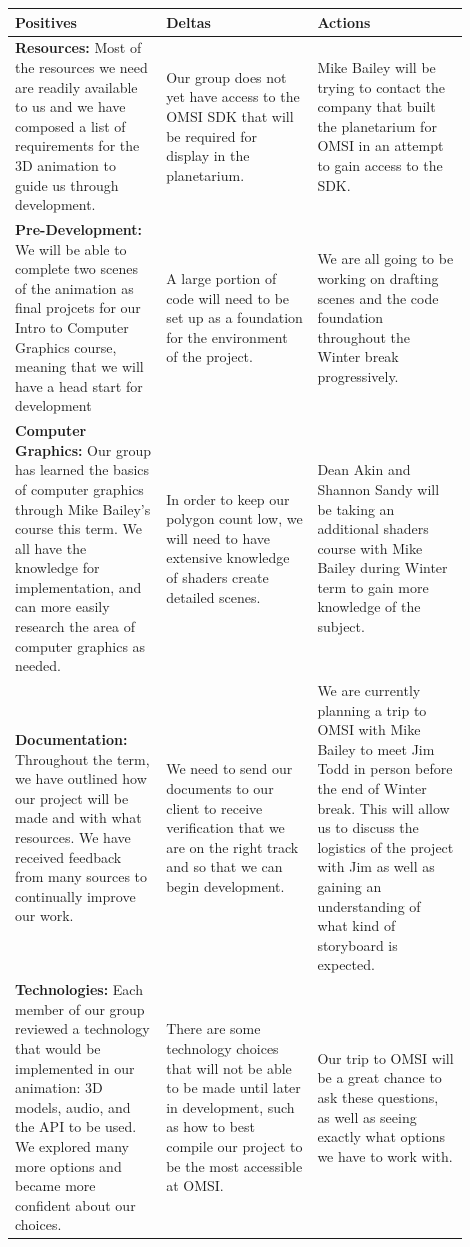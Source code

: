 \documentclass[onecolumn, draftclsnofoot,10pt, compsoc]{IEEEtran}
\begin{document}
\begin{tabular}{|p{0.3\linewidth}|p{0.3\linewidth}|p{0.3\linewidth}|}
\hline
     Positives & Deltas & Actions  \\
    \hline
    
    
    
    \textbf{Resources:} Most of the resources we need are readily available to us and we have composed a list of requirements for the 3D animation to guide us through development. & Our group does not yet have access to the OMSI SDK that will be required for display in the planetarium. & Mike Bailey will be trying to contact the company that built the planetarium for OMSI in an attempt to gain access to the SDK.\\ 
     \hline
	\textbf{Pre-Development:} We will be able to complete two scenes of the animation as final projcets for our Intro to Computer Graphics course, meaning that we will have a head start for development & A large portion of code will need to be set up as a foundation for the environment of the project. & We are all going to be working on drafting scenes and the code foundation throughout the Winter break progressively.\\
     \hline
     \textbf{Computer Graphics:} Our group has learned the basics of computer graphics through Mike Bailey's course this term. We all have the knowledge for implementation, and can more easily research the area of computer graphics as needed. & In order to keep our polygon count low, we will need to have extensive knowledge of shaders create detailed scenes. & Dean Akin and Shannon Sandy will be taking an additional shaders course with Mike Bailey during Winter term to gain more knowledge of the subject.\\
     \hline
     \textbf{Documentation:} Throughout the term, we have outlined how our project will be made and with what resources. We have received feedback from many sources to continually improve our work. & We need to send our documents to our client to receive verification that we are on the right track and so that we can begin development. & We are currently planning a trip to OMSI with Mike Bailey to meet Jim Todd in person before the end of Winter break. This will allow us to discuss the logistics of the project with Jim as well as gaining an understanding of what kind of storyboard is expected.\\
     \hline
     \textbf{Technologies:} Each member of our group reviewed a technology that would be implemented in our animation: 3D models, audio, and the API to be used. We explored many more options and became more confident about our choices. & There are some technology choices that will not be able to be made until later in development, such as how to best compile our project to be the most accessible at OMSI. & Our trip to OMSI will be a great chance to ask these questions, as well as seeing exactly what options we have to work with. \\ 
     \hline
     
\end{tabular}
\end{document}
